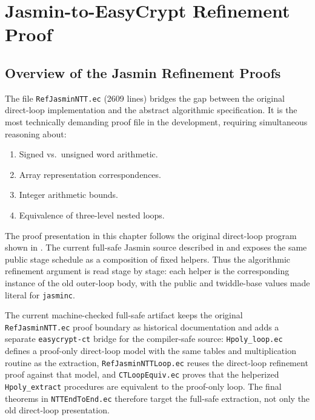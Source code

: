 
\chapter{Jasmin-to-EasyCrypt Refinement Proof}
\label{ch:refinement}

\section{Overview of the Jasmin Refinement Proofs}

The file \texttt{RefJasminNTT.ec} (2609 lines) bridges the gap between the
original direct-loop \jasmin{} implementation and the abstract algorithmic
specification.  It is the most technically demanding proof file in the
development, requiring simultaneous reasoning about:
\begin{enumerate}
  \item Signed vs.\ unsigned word arithmetic.
  \item Array representation correspondences.
  \item Integer arithmetic bounds.
  \item Equivalence of three-level nested loops.
\end{enumerate}

The proof presentation in this chapter follows the original direct-loop
program shown in .  The current
full-safe Jasmin source described in  and
 exposes the same public stage schedule
as a composition of fixed helpers.  Thus the algorithmic refinement argument is
read stage by stage: each helper is the corresponding instance of the old
outer-loop body, with the public  and twiddle-base values made
literal for \texttt{jasminc}.

The current machine-checked full-safe artifact keeps the original
\texttt{RefJasminNTT.ec} proof boundary as historical documentation and adds a
separate \texttt{easycrypt-ct} bridge for the compiler-safe source:
\texttt{Hpoly\_loop.ec} defines a proof-only direct-loop model with the same
tables and multiplication routine as the extraction,
\texttt{RefJasminNTT\allowbreak Loop.ec} reuses the direct-loop refinement proof against
that model, and \texttt{CTLoopEquiv.ec} proves that the helperized
\texttt{Hpoly\_extract} procedures are equivalent to the proof-only loop.
The final theorems in \texttt{NTTEndToEnd.ec} therefore target the full-safe
\jasmin{} extraction, not only the old direct-loop presentation.

